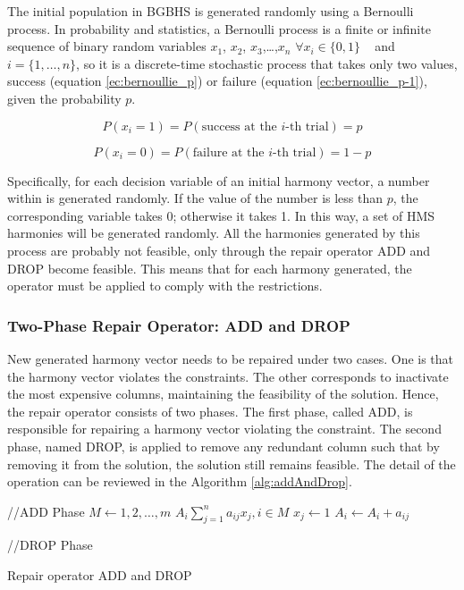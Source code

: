 The initial population in BGBHS is generated randomly using a Bernoulli process. In probability and statistics, a Bernoulli process is a finite or infinite sequence of binary random variables $x_1$, $x_2$, $x_3$,\dots,$x_n$  $\forall x_i \in \{0,1\}$ ~ and ~ $i=\{1,\dots, n\}$, so it is a discrete-time stochastic process that takes only two values, success (equation \ref{ec:bernoullie_p}) or failure (equation \ref{ec:bernoullie_p-1}), given the probability $p$.

\begin{equation} \label{ec:bernoullie_p} 
P(x_i=1) = P(\text{success at the $i$-th trial}) = p 
\end{equation}	

\begin{equation} \label{ec:bernoullie_p-1} 
P(x_i=0) = P(\text{failure at the $i$-th trial}) = 1-p
\end{equation}	

Specifically, for each decision variable of an initial harmony vector, a number within is generated randomly. If the value of the number is less than $p$, the corresponding variable takes 0; otherwise it takes 1. In this way, a set of HMS harmonies will be generated randomly. All the harmonies generated by this process are probably not feasible, only through the repair operator ADD and DROP become feasible. This means that for each harmony generated, the operator must be applied to comply with the restrictions.

\subsubsection{Two-Phase Repair Operator: ADD and DROP}\label{subAddAndDrop}
New generated harmony vector needs to be repaired under two cases. One is that the harmony vector violates the constraints. The other corresponds to inactivate the most expensive columns, maintaining the feasibility of the solution. Hence, the repair operator consists of two phases. The first phase, called ADD, is responsible for repairing a harmony vector violating the constraint. The second phase, named DROP, is applied to remove any redundant column such that by removing it from the solution, the solution still remains feasible. The detail of the operation can be reviewed in the Algorithm \ref{alg:addAndDrop}.

\begin{algorithm}
\begin{algorithmic}[1]
 \STATE //ADD Phase
\STATE $M \gets 1,2,\ldots, m$
\STATE $A_i \sum_{j=1}^{n} a_{ij}x_{j}, i \in M$
 {
	 {
		\STATE $x_j \gets 1$
		\STATE $A_i \gets A_i + a_{ij}$
	}\ENDIF
} \ENDFOR

\STATE //DROP Phase
 \ENDFOR

\caption{Repair operator ADD and DROP}\label{alg:addAndDrop}
\end{algorithmic}
\end{algorithm}


